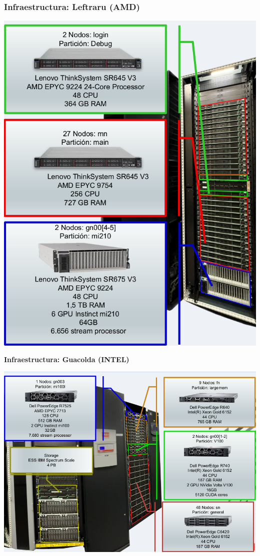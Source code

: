 \documentclass[aspectratio=169,professionalfonts]{beamer}
\begin{document}
\begin{frame}[fragile]
\frametitle{\textbf{Infraestructura: Leftraru (AMD)}}
    \begin{center}
            \includegraphics[scale=0.2]{FIGURES/leftraru.png}
    \end{center}    
\end{frame}

\begin{frame}{\textbf{Infraestructura: Guacolda (INTEL)}}
    \begin{center}
            \includegraphics[scale=0.3]{FIGURES/guacolda.png}

    \end{center}
    
\end{frame}
\end{document}
